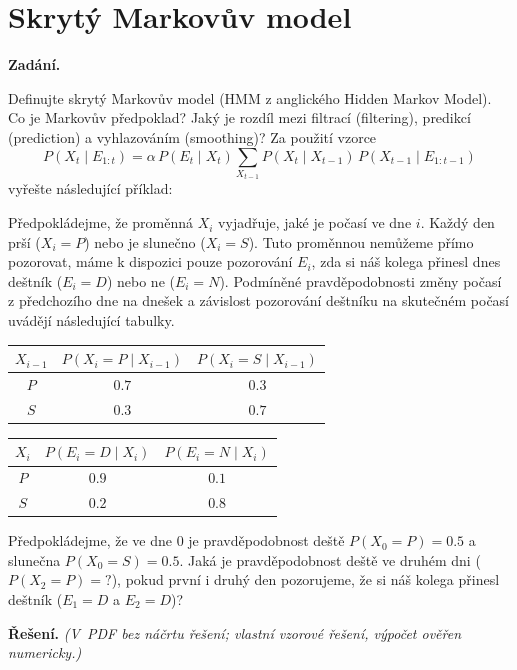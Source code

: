\section{Skrytý Markovův model}

\noindent\textbf{Zadání.}\par
Definujte skrytý Markovův model (HMM z anglického Hidden Markov Model). Co je Markovův předpoklad? Jaký je rozdíl mezi filtrací (filtering), predikcí (prediction) a vyhlazováním (smoothing)? Za použití vzorce
\[
  P(X_t \mid E_{1:t}) = \alpha\, P(E_t \mid X_t) \sum_{X_{t-1}} P(X_t \mid X_{t-1})\, P(X_{t-1} \mid E_{1:t-1})
\]
vyřešte následující příklad:

Předpokládejme, že proměnná $X_i$ vyjadřuje, jaké je počasí ve dne $i$. Každý den prší ($X_i = P$) nebo je slunečno ($X_i = S$). Tuto proměnnou nemůžeme přímo pozorovat, máme k dispozici pouze pozorování $E_i$, zda si náš kolega přinesl dnes deštník ($E_i = D$) nebo ne ($E_i = N$). Podmíněné pravděpodobnosti změny počasí z předchozího dne na dnešek a závislost pozorování deštníku na skutečném počasí uvádějí následující tabulky.

\begin{center}
\begin{tabular}{ccc}
\toprule
$X_{i-1}$ & $P(X_i = P \mid X_{i-1})$ & $P(X_i = S \mid X_{i-1})$ \\
\midrule
$P$ & $0.7$ & $0.3$ \\
$S$ & $0.3$ & $0.7$ \\
\bottomrule
\end{tabular}
\qquad
\begin{tabular}{ccc}
\toprule
$X_i$ & $P(E_i = D \mid X_i)$ & $P(E_i = N \mid X_i)$ \\
\midrule
$P$ & $0.9$ & $0.1$ \\
$S$ & $0.2$ & $0.8$ \\
\bottomrule
\end{tabular}
\end{center}

Předpokládejme, že ve dne $0$ je pravděpodobnost deště $P(X_0 = P) = 0.5$ a slunečna $P(X_0 = S) = 0.5$. Jaká je pravděpodobnost deště ve druhém dni ($P(X_2 = P) = ?$), pokud první i druhý den pozorujeme, že si náš kolega přinesl deštník ($E_1 = D$ a $E_2 = D$)?

\medskip
\noindent\textbf{Řešení.} \textit{(V~PDF bez náčrtu řešení; vlastní vzorové řešení, výpočet ověřen numericky.)}\par

